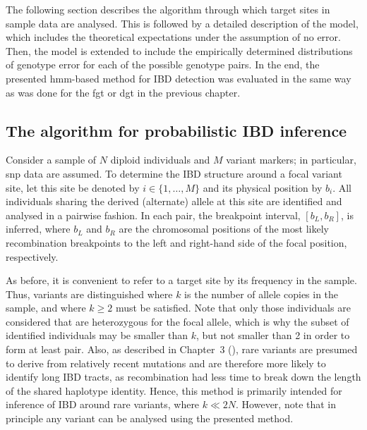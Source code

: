The following section describes the algorithm through which target sites in sample data are analysed.
This is followed by a detailed description of the model, which includes the theoretical expectations under the assumption of no error.
Then, the model is extended to include the empirically determined distributions of genotype error for each of the possible genotype pairs.
In the end, the presented \gls{hmm}-based method for IBD detection was evaluated in the same way as was done for the \gls{fgt} or \gls{dgt} in the previous chapter.


%
\subsection{The algorithm for probabilistic IBD inference}\label{sec:ghmm_algorithm}
%


Consider a sample of $N$ diploid individuals and $M$ variant markers; in particular, \gls{snp} data are assumed.
To determine the IBD structure around a focal variant site, let this site be denoted by ${i \in \lbrace 1, \ldots, M \rbrace}$ and its physical position by $b_i$.
All individuals sharing the derived (alternate) allele at this site are identified and analysed in a pairwise fashion.
In each pair, the breakpoint interval, ${[b_L, b_R]}$, is inferred, where $b_L$ and $b_R$ are the chromosomal positions of the most likely recombination breakpoints to the left and right-hand side of the focal position, respectively.

As before, it is convenient to refer to a target site by its frequency in the sample.
Thus, \fk{} variants are distinguished where $k$ is the number of allele copies in the sample, and where ${k \geq 2}$ must be satisfied.
Note that only those individuals are considered that are heterozygous for the focal allele, which is why the subset of identified individuals may be smaller than $k$, but not smaller than 2 in order to form at least  pair.
Also, as described in Chapter~3 (), rare variants are presumed to derive from relatively recent mutations and are therefore more likely to identify long IBD tracts, as recombination had less time to break down the length of the shared haplotype identity.
Hence, this method is primarily intended for inference of IBD around rare variants, where ${k \ll 2N}$.
However, note that in principle any  variant can be analysed using the presented method.

